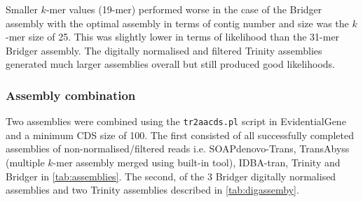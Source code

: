 Smaller \(k\)-mer values (19-mer) performed worse in the case of the Bridger assembly
with the optimal assembly in terms of contig number and size was the \(k\)-mer size 
of 25.  This was slightly lower in terms of likelihood than the 31-mer Bridger
assembly. The digitally normalised and filtered Trinity assemblies 
generated much larger assemblies overall but still produced good likelihoods.

\subsubsection{Assembly combination}

Two assemblies were combined using the \texttt{tr2aacds.pl} script in EvidentialGene 
and a minimum CDS size of 100. The first consisted of all successfully completed
assemblies of non-normalised/filtered reads i.e. SOAPdenovo-Trans, TransAbyss (multiple \(k\)-mer
assembly merged using built-in tool),
IDBA-tran, Trinity and Bridger in \cref{tab:assemblies}.  The second, 
of the 3 Bridger digitally normalised assemblies and two Trinity assemblies 
described in \cref{tab:digassemby}.

\begin{table}[h!]

    \caption[Merged assembly summary]{Summary of merged multi-assemblies.  Collapsed contigs is the number of contigs
    found in the merged set by the EvidentialGene pipeline. The level of assembly
reduction and redundancy removal is high and, at first appearance, is impressively consistent 
between meta-assemblies despite differences in preprocessing. 
  However, CD-HIT metaclustering
at 90\% identity shown at the bottom demonstrated that there was very little overlap between
these two minimised assemblies.  Even the merged normalised assemblies generated
a meta-assembly of lower overall likelihood than the best individual constituent assemblies.}
    \label{tab:comb_assemb}
\end{table}

